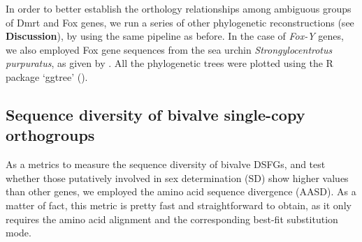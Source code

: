 \documentclass[../main.tex]{subfiles}
\begin{document}
In order to better establish the orthology relationships among ambiguous groups of Dmrt and Fox genes, we run a series of other phylogenetic reconstructions (see \textbf{Discussion}), by using the same pipeline as before. In the case of \textit{Fox-Y} genes, we also employed Fox gene sequences from the sea urchin \textit{Strongylocentrotus purpuratus}, as given by \textbf{\cite{tu2006sea}}. All the phylogenetic trees were plotted using the R package ‘ggtree’ (\textbf{\cite{yu2017ggtree}}).

\subsection{Sequence diversity of bivalve single-copy orthogroups}
As a metrics to measure the sequence diversity of bivalve DSFGs, and test whether those putatively involved in sex determination (SD) show higher values than other genes, we employed the amino acid sequence divergence (AASD). As a matter of fact, this metric is pretty fast and straightforward to obtain, as it only requires the amino acid alignment and the corresponding best-fit substitution mode.
\end{document}
